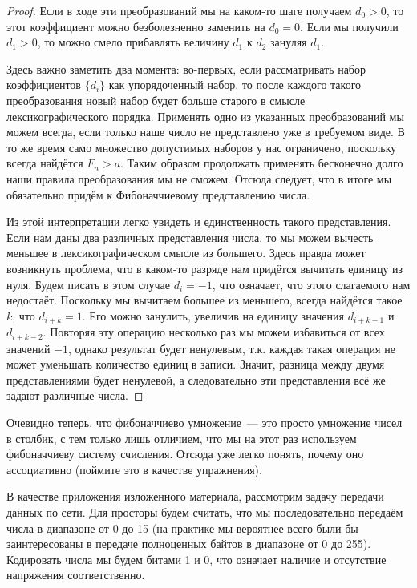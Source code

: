 \begin{proof}
Если в ходе эти преобразований мы на каком-то шаге получаем $d_0 > 0$, то этот коэффициент можно безболезненно заменить на $d_0 = 0$. Если мы получили $d_1 > 0$, то можно смело прибавлять величину $d_1$ к $d_2$ зануляя $d_1$.

Здесь важно заметить два момента: во-первых, если рассматривать набор коэффициентов $\{d_i\}$ как упорядоченный набор, то после каждого такого преобразования новый набор будет больше старого в смысле лексикографического порядка. Применять одно из указанных преобразований мы можем всегда, если только наше число не представлено уже в требуемом виде. В то же время само множество допустимых наборов у нас ограничено, поскольку всегда найдётся $F_n > a$. Таким образом продолжать применять бесконечно долго наши правила преобразования мы не сможем. Отсюда следует, что в итоге мы обязательно придём к Фибоначчиевому представлению числа.

Из этой интерпретации легко увидеть и единственность такого представления. Если нам даны два различных представления числа, то мы можем вычесть меньшее в лексикографическом смысле из большего. Здесь правда может возникнуть проблема, что в каком-то разряде нам придётся вычитать единицу из нуля. Будем писать в этом случае $d_i =-1$, что означает, что этого слагаемого нам недостаёт. Поскольку мы вычитаем большее из меньшего, всегда найдётся такое $k$, что $d_{i+k} = 1$. Его можно занулить, увеличив на единицу значения $d_{i+k - 1}$ и $d_{i+k-2}$. Повторяя эту операцию несколько раз мы можем избавиться от всех значений $-1$, однако результат будет ненулевым, т.к. каждая такая операция не может уменьшать количество единиц в записи. Значит, разница между двумя представлениями будет ненулевой, а следовательно эти представления всё же задают различные числа.
\end{proof}

Очевидно теперь, что фибоначчиево умножение~— это просто умножение чисел в столбик, с тем только лишь отличием, что мы на этот раз используем фибоначчиеву систему счисления. Отсюда уже легко понять, почему оно ассоциативно (поймите это в качестве упражнения).

В качестве приложения изложенного материала, рассмотрим задачу передачи данных по сети. Для просторы будем считать, что мы последовательно передаём числа в диапазоне от 0 до 15 (на практике мы вероятнее всего были бы заинтересованы в передаче полноценных байтов в диапазоне от 0 до 255). Кодировать числа мы будем битами 1 и 0, что означает наличие и отсутствие напряжения соответственно.


